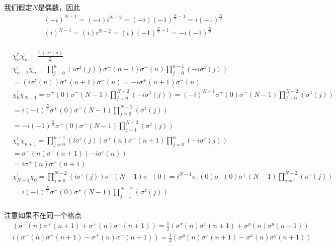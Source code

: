 我们假定$N$是偶数，因此
\begin{equation}
\begin{split}
&(-i)^{N-1} = (-i)i^{N-2} =(-i) (-1)^{\frac{N}{2}-1}=i(-1)^{\frac{N}{2}}\\
&(i)^{N-1} = (i)i^{N-2} =(i) (-1)^{\frac{N}{2}-1}=-i(-1)^{\frac{N}{2}}\\
\end{split}
\end{equation}

\begin{equation}
\begin{split}
&\chi^{\dagger}_n\chi _n = \frac{1+\sigma ^z(n)}{2}\\
&\chi^{\dagger}_{n+1}\chi _n = \prod _{j=0}^n(i\sigma ^z(j)) \sigma ^+(n+1)\sigma ^-(n)\prod _{j=0}^{n-1}(-i\sigma ^z(j))\\
&=(i\sigma ^z(n)) \sigma ^+(n+1)\sigma ^-(n)= -i\sigma ^+(n+1)\sigma ^-(n)\\
&\chi^{\dagger}_{0}\chi _{N-1} = \sigma ^+(0)\sigma ^-(N-1)\prod _{j=0}^{N-2}(-i\sigma ^z(j))=(-i)^{N-1}\sigma ^+(0)\sigma ^-(N-1)\prod _{j=0}^{N-2}(\sigma ^z(j))\\
&=i(-1)^{\frac{N}{2}}\sigma ^+(0)\sigma ^-(N-1)\prod _{j=0}^{N-2}(\sigma ^z(j))\\
&=-i(-1)^{\frac{N}{2}}\sigma ^+(0)\sigma ^-(N-1)\prod _{j=1}^{N-2}(\sigma ^z(j))\\
&\chi^{\dagger}_{n}\chi _{n+1}=\prod _{j=0}^{n-1}(i\sigma ^z(j)) \sigma ^+(n)\sigma ^-(n+1)\prod _{j=0}^{n}(-i\sigma ^z(j))\\
&=\sigma ^+(n)\sigma^-(n+1)\left(-i \sigma ^z(n)\right)\\
&=i\sigma ^+(n)\sigma^-(n+1)\\
&\chi^{\dagger}_{N-1}\chi _{0}=\prod _{j=0}^{N-2}(i\sigma ^z(j)) \sigma ^+(N-1)\sigma ^-(0)=i^{N-1}\sigma _z(0)\sigma ^-(0)\sigma ^+(N-1)\prod _{j=1}^{N-2}(\sigma ^z(j))\\
&=i(-1)^{\frac{N}{2}}\sigma ^-(0)\sigma ^+(N-1)\prod _{j=1}^{N-2}(\sigma ^z(j))\\
\end{split}
\end{equation}

注意如果不在同一个格点
\begin{equation}
\begin{split}
&\left(\sigma ^-(n)\sigma ^+(n+1)+\sigma ^+(n)\sigma ^- (n+1)\right) = \frac{1}{2}\left(\sigma ^x(n)\sigma ^x(n+1)+\sigma ^y(n)\sigma ^y(n+1)\right)\\
&i\left(\sigma ^-(n)\sigma ^+(n+1)-\sigma ^+(n)\sigma ^- (n+1)\right) = \frac{1}{2}\left(\sigma ^y(n)\sigma ^x(n+1)-\sigma ^x(n)\sigma ^y(n+1)\right)\\
\end{split}
\end{equation}

